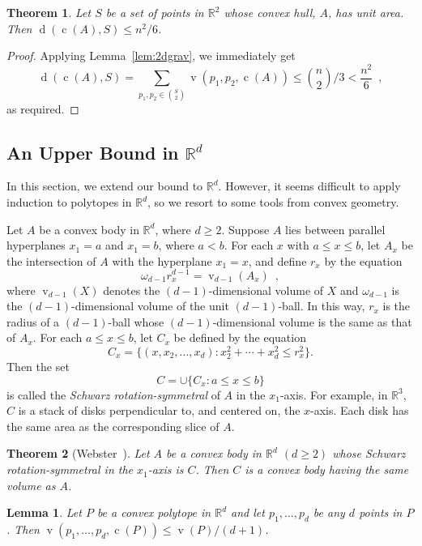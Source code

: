 \documentclass[preprint, 12pt]{elsarticle}
\newtheorem{thm}{Theorem}
\newtheorem{lem}{Lemma}
\DeclareMathOperator{\od}{d}
\DeclareMathOperator{\vol}{v}
\DeclareMathOperator{\cog}{c}
\newcommand{\R}{\mathbb{R}}
\begin{document}
\begin{thm}
  \label{thm:2dcenter}
  Let $S$ be a set of points in $\R^2$ whose convex hull, $A$, has unit area. Then $\od(\cog(A),S)\le n^2/6$.
\end{thm}

\begin{proof}
  Applying Lemma~\ref{lem:2dgrav}, we immediately get
\[\od(\cog(A), S) = \sum_{p_{1},p_{2}\in \binom{S}{2}} \vol(p_{1},p_{2},\cog(A)) \leq \binom{n}{2}/3 < \frac{n^{2}}{6}\enspace ,\]
as required.
\end{proof}


\subsection{An Upper Bound  in  $\mathbb{R}^{d}$}

In this section, we extend our bound to $\R^d$. However, it seems
difficult to apply induction to polytopes in $\R^d$, so we resort to
some tools from convex geometry.

Let $A$ be a convex body in $\mathbb{R}^{d}$, where $d \geq 2$. Suppose
$A$ lies between parallel hyperplanes $x_{1} = a$ and $x_{1} = b$,
where $a < b$. For each $x$ with $a \leq x \leq b$, let $A_{x}$ be the
intersection of $A$ with the hyperplane $x_{1} = x$, and define $r_{x}$
by the equation
\[ \omega_{d-1}r_{x}^{d-1} = \vol_{d-1}(A_{x})\enspace , \]
where $\vol_{d-1}(X)$ denotes the $(d-1)$-dimensional volume of $X$ and
$\omega_{d-1}$ is the $(d-1)$-dimensional volume of the unit $(d-1)$-ball.
In this way, $r_{x}$ is the radius of a $(d-1)$-ball whose $(d-1)$-dimensional volume is the same as that of $A_{x}$. For each $a \leq x \leq b$, let $C_{x}$ be defined by the equation
\[ C_{x} = \{ (x, x_{2}, \ldots, x_{d}) : x_{2}^{2} + \cdots + x_{d}^{2} \leq r_{x}^{2} \}. \]
Then the set
\[ C = \cup \{C_{x} : a \leq x \leq b\} \]
is called the \emph{Schwarz rotation-symmetral} of $A$ in the $x_{1}$-axis.
For example, in $\R^3$, $C$ is a stack of disks perpendicular to, and
centered on, the $x$-axis. Each disk has the same area as the corresponding
slice of $A$.

\begin{thm}[Webster~\cite{Webs95}]
  \label{thm:webs}
  Let $A$ be a convex body in $\mathbb{R}^{d}$ $(d \geq 2)$ whose Schwarz rotation-symmetral in the $x_{1}$-axis is $C$. Then $C$ is a convex body having the same volume as $A$.
\end{thm}


\begin{lem}
  \label{lem:simpvol}
  Let $P$ be a convex polytope in $\R^d$ and let $p_1,\ldots,p_d$ be any $d$ points in $P$.  Then $\vol(p_1,\ldots,p_d,\cog(P))\le \vol(P)/(d+1)$.
\end{lem}
\end{document}
